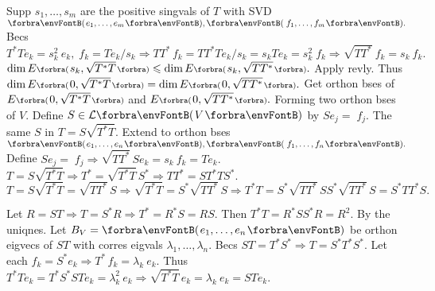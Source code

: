 
Supp $s_1,\dots,s_m$ are the positive singvals of $T$ with SVD $\Par{e_1,\dots,e_m},\Par{\,f_1,\dots,f_m}.$\vspace{1pt}\parSol{}
Becs $T^*Te_k=s_k^2\:\!e_k,\;f_k=Te_k\big/s_k\Rightarrow TT^*\,f_k=TT^*Te_k\big/s_k=s_kTe_k=s_k^2\;f_k\Rightarrow\sqrt{TT^*}\:f_k=s_k\:f_k.$\vspace{1pt}\parSol{}
$\dim E\BigPar{s_k,\sqrt{T^*T}}\leqslant\dim E\BigPar{s_k,\sqrt{TT^*}}.$ Apply revly. Thus $\dim E\BigPar{0,\sqrt{T^*T}}=\dim E\BigPar{0,\sqrt{TT^*}}.$\vspace{1pt}\parSol{}
Get orthon bses of $E\BigPar{0,\sqrt{T^*T}}$ and $E\BigPar{0,\sqrt{TT^*}}.$ Forming two orthon bses of $V.$\parSol{}
Define $S\in\Lm{V}$ by $Se_j=\;\!f_j.$ \quad\ANote The same $S$ in $T=S\sqrt{T^*T}.$\PfEnd\vspace{2pt}\parSol{}
\Or Extend to orthon bses $\Par{e_1,\dots,e_n},\Par{\,f_1,\dots,f_n}.$ Define $Se_j=\;\!f_j\Rightarrow\sqrt{TT^*}\,Se_k=s_k\:f_k=Te_k.$\PfEnd\vspace{4pt}
\ACoro $T=S\sqrt{T^*T}\Rightarrow T^*=\sqrt{T^*T}\,S^*\Longrightarrow TT^*=ST^*TS^*.$\parCor
\Or $T=S\sqrt{T^*T}=\sqrt{TT^*}\,S\Rightarrow \sqrt{T^*T}=S^*\sqrt{TT^*}\,S\Longrightarrow T^*T=S^*\sqrt{TT^*}\,SS^*\sqrt{TT^*}\,S=S^*TT^*S.$
\SepLine

Let $R=ST\Rightarrow T=S^*R\Rightarrow T^*=R^*S=RS.$ Then $T^*T=R^*SS^*R=R^2.$ \;By the uniqnes.\PfEnd\vspace{2pt}\parSol{}
\Or Let $B_V=\Par{e_1,\dots,e_n}$ be orthon eigvecs of $ST$ with corres eigvals $\lambda_1,\dots,\lambda_n.$\parSol{}
Becs $ST=T^*S^*\Rightarrow T=S^*T^*S^*.$ \;Let each \:$f_k=S^*e_k\Rightarrow T^*\,f_k=\lambda_k\:\!e_k.$\parSol{}
Thus $T^*Te_k=T^*S^*STe_k=\lambda_k^2\:\!e_k\Rightarrow\sqrt{T^*T}\,e_k=\lambda_k\:\!e_k=STe_k.$\PfEnd
\SepLine

